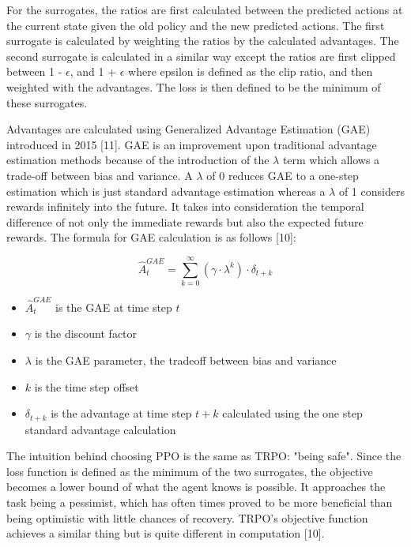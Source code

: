 \documentclass{article}
\begin{document}
	For the surrogates, the ratios are first calculated between the predicted actions at the current state given the old policy and the new predicted actions. The first surrogate is calculated by weighting the ratios by the calculated advantages. The second surrogate is calculated in a similar way except the ratios are first clipped between 1 - $\epsilon$, and 1 + $\epsilon$ where epsilon is defined as the clip ratio, and then weighted with the advantages. The loss is then defined to be the minimum of these surrogates.
	
	Advantages are calculated using Generalized Advantage Estimation (GAE) introduced in 2015 [11]. GAE is an improvement upon traditional advantage estimation methods because of the introduction of the $\lambda$ term which allows a trade-off between bias and variance. A $\lambda$ of 0 reduces GAE to a one-step estimation which is just standard advantage estimation whereas a $\lambda$ of 1 considers rewards infinitely into the future. It takes into consideration the temporal difference of not only the immediate rewards but also the expected future rewards. The formula for GAE calculation is as follows [10]:
	
	\begin{equation}
		\hat{A}^{GAE}_{t} = \sum_{k=0}^{\infty}(\gamma\cdot\lambda^{k})\cdot\delta_{t+k}
	\end{equation}
	\begin{itemize}
		\item $\hat{A}^{GAE}_{t}$ is the GAE at time step $t$
		\item $\gamma$ is the discount factor
		\item $\lambda$ is the GAE parameter, the tradeoff between bias and variance
		\item $k$ is the time step offset
		\item $\delta_{t+k}$ is the advantage at time step $t+k$ calculated using the one step standard advantage calculation
	\end{itemize}
	
	The intuition behind choosing PPO is the same as TRPO: "being safe". Since the loss function is defined as the minimum of the two surrogates, the objective becomes a lower bound of what the agent knows is possible. It approaches the task being a pessimist, which has often times proved to be more beneficial than being optimistic with little chances of recovery. TRPO's objective function achieves a similar thing but is quite different in computation [10].
	
\end{document}

